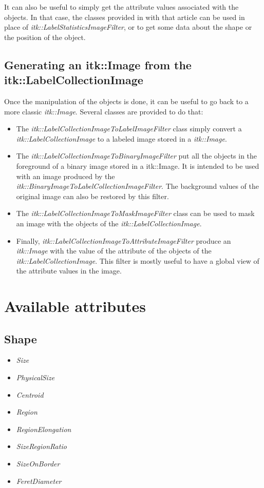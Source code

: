 \documentclass{InsightArticle}
\begin{document}
It can also be useful to simply get the attribute values associated with the
objects. In that case, the classes provided in with that article can be used in
place of {\em itk::LabelStatisticsImageFilter}, or to get some data about the
shape or the position of the object.

\subsection{Generating an itk::Image from the itk::LabelCollectionImage}

Once the manipulation of the objects is done, it can be useful to go back to a
more classic {\em itk::Image}. Several classes are provided to do that:
\begin{itemize}
  \item The {\em itk::LabelCollectionImageToLabelImageFilter} class simply
convert a {\em itk::LabelCollectionImage} to a labeled image stored in a {\em
itk::Image}.
  \item The {\em itk::LabelCollectionImageToBinaryImageFilter} put all the
objects in the foreground of a binary image stored in a {itk::Image}. It is
intended to be used with an image produced by the {\em
itk::BinaryImageToLabelCollectionImageFilter}. The background values of the
original image can also be restored by this filter.
  \item The {\em itk::LabelCollectionImageToMaskImageFilter} class can be used
to mask an image with the objects of the {\em itk::LabelCollectionImage}.
  \item Finally, {\em itk::LabelCollectionImageToAttributeImageFilter} produce
an {\em itk::Image} with the value of the attribute of the objects of the {\em
itk::LabelCollectionImage}. This filter is mostly useful to have a global view
of the attribute values in the image.
\end{itemize}

\section{Available attributes}

\subsection{Shape}

\begin{itemize}
  \item {\em Size}
  \item {\em PhysicalSize}
  \item {\em Centroid}
  \item {\em Region}
  \item {\em RegionElongation}
  \item {\em SizeRegionRatio}
  \item {\em SizeOnBorder}
  \item {\em FeretDiameter}
\end{itemize}
\end{document}
